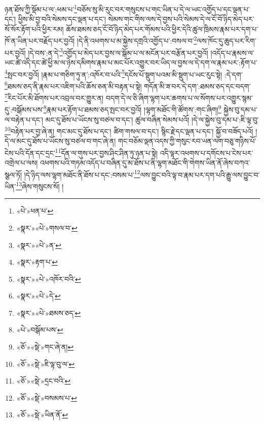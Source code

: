 ཉན་ཐོས་ཀྱི་སྡོམ་པ་ལ་:ཕམ་པ་\footnote{«པེ་»ཕན་པ་}བཅོས་སུ་མི་རུང་བར་གསུངས་པ་གང་ཡིན་པ་དེ་ལ་ཡང་འགྱོད་པ་དང་ལྡན་པ་དང་། ཕྱིས་མི་བྱ་བའི་སེམས་དང་ལྡན་པ་དང་། སེམས་གང་གིས་ལས་དེ་བྱས་པའི་སེམས་དེ་ལ་ངོ་བོ་ཉིད་མེད་པར་སོ་སོར་རྟོག་པའི་ཕྱིར་རམ། ཆོས་ཐམས་ཅད་ངོ་བོ་ཉིད་མེད་པར་གོམས་པའི་ཕྱིར་དེའི་ཚུལ་ཁྲིམས་རྣམ་པར་དག་པ་ཁོ་ན་ཡིན་པར་བརྗོད་པར་བྱའོ། །དེ་ནི་འཕགས་པ་མ་སྐྱེས་དགྲའི་འགྱོད་པ་:བསལ་བ་\footnote{«སྣར་»«པེ་»གསལ་བ་}ལས་ཁོང་དུ་ཆུད་པར་རིག་པར་བྱའོ། །དེ་བས་:ན་དེ་\footnote{«སྣར་»«པེ་»ན་}འགྱོད་པ་མེད་པར་བྱས་ལ་སྒོམ་པ་ལ་མངོན་པར་བརྩོན་པར་བྱའོ། །འདོད་པ་རྣམས་ལ་ཡང་ཚེ་འདི་དང་ཚེ་ཕྱི་མ་ལ་ཉེས་དམིགས་རྣམ་པ་མང་པོར་འགྱུར་བར་ཡིད་ལ་བྱས་ལ་དེ་དག་ལ་རྣམ་པར་:རྟོག་པ་\footnote{«སྣར་»རྟག་པ་}སྤང་བར་བྱའོ། །རྣམ་པ་གཅིག་ཏུ་ན་:འཁོར་བ་པའི་\footnote{«སྣར་»«པེ་»འཁོར་བའི་}དངོས་པོ་སྡུག་པའམ་མི་སྡུག་པ་ཡང་རུང་སྟེ། :དེ་དག་\footnote{«སྣར་»«པེ་»དེ་}ཐམས་ཅད་ནི་རྣམ་པར་འཇིག་པའི་ཆོས་ཅན་མི་བརྟན་པ་སྟེ། གདོན་མི་ཟ་བར་དེ་དག་:ཐམས་ཅད་དང་བདག་\footnote{«སྣར་»«པེ་»ཐམས་ཅད་}རིང་པོར་མི་ཐོགས་པར་འབྲལ་བར་གྱུར་ན། བདག་དེ་ལ་ཅི་ཞིག་ལྷག་པར་ཆགས་པ་ལ་སོགས་པར་འགྱུར་སྙམ་དུ་:བསྒོམས་པས་\footnote{«པེ་»བསྒོམ་པས་}རྣམ་པར་རྟོག་པ་ཐམས་ཅད་སྤང་བར་བྱའོ། །ལྷག་མཐོང་གི་ཚོགས་:གང་ཞིག།\footnote{«ཅོ་»«སྡེ་»གང་ཞེ་ན།} སྐྱེས་བུ་དམ་པ་ལ་བརྟེན་པ་དང་། མང་དུ་ཐོས་པ་ཡོངས་སུ་བཙལ་བ་དང་། ཚུལ་བཞིན་སེམས་པའོ། །དེ་ལ་སྐྱེས་བུ་དམ་པ་:ཇི་ལྟ་བུ་\footnote{«ཅོ་»«སྡེ་»ཇི་ལྟ་བུ་ལ་}བརྟེན་པར་བྱ་ཞེ་ན། གང་མང་དུ་ཐོས་པ་དང་། ཚིག་གསལ་བ་དང་། སྙིང་རྗེ་དང་ལྡན་པ་དང་། སྐྱོ་བ་བཟོད་པའོ། །དེ་ལ་མང་དུ་ཐོས་པ་ཡོངས་སུ་བཙལ་བ་གང་ཞེ་ན། གང་བཅོམ་ལྡན་འདས་ཀྱི་གསུང་རབ་ཡན་ལག་བཅུ་གཉིས་པོ་ངེས་པའི་དོན་དང་དྲང་\footnote{«ཅོ་»«སྡེ་»དྲང་བའི་}དོན་ལ་གུས་པར་བྱས་ཤིང་ཤིན་ཏུ་ཉན་པ་སྟེ། འདི་ལྟར་འཕགས་པ་དགོངས་པ་ངེས་པར་འགྲེལ་པ་ལས། འཕགས་པའི་གཏམ་འདོད་པ་བཞིན་དུ་མ་ཐོས་པ་ནི་ལྷག་མཐོང་གི་གེགས་ཡིན་ནོ་ཞེས་བཀའ་སྩལ་ཏོ། །དེ་ཉིད་ལས་ལྷག་མཐོང་ནི་ཐོས་པ་དང་:བསམ་པ་\footnote{«ཅོ་»«སྡེ་»བསམས་པ་}ལས་བྱུང་བའི་ལྟ་བ་རྣམ་པར་དག་པའི་རྒྱུ་ལས་བྱུང་བ་ཡིན་\footnote{«ཅོ་»«སྡེ་»ཡིན་ནོ་}ཞེས་གསུངས་སོ། །

